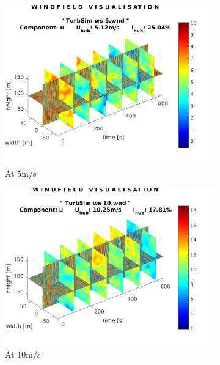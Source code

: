\documentclass[10pt]{article}
\begin{document}
\begin{figure}[htb!]
\centering
\begin{subfigure}{0.4\textwidth}
  \centering
  \includegraphics[width=1\linewidth]{../CIP_5/CIP_Tutorial_5_-_Windfield_and_wake_simulation/TurbSim/wind_5ms.png}
  \caption{At 5m/s}
\end{subfigure}
\begin{subfigure}{0.4\textwidth}
  \centering
  \includegraphics[width=1\linewidth]{../CIP_5/CIP_Tutorial_5_-_Windfield_and_wake_simulation/TurbSim/wind_10ms.png}
   \caption{At 10m/s}
\end{subfigure}
\begin{subfigure}{0.4\textwidth}
  \centering

\end{subfigure}
\end{figure}
\end{document}
